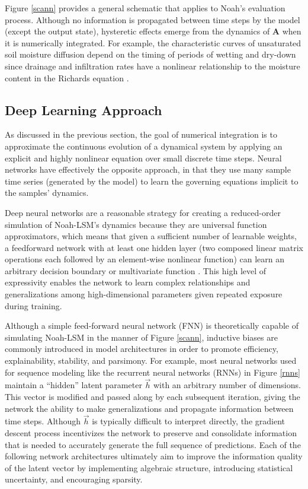 \documentclass[11pt]{article}
\begin{document}
\begin{multicols}{2}

    Figure \ref{scann} provides a general schematic that applies to Noah's evaluation process. Although no information is propagated between time steps by the model (except the output state), hysteretic effects emerge from the dynamics of \textbf{A} when it is numerically integrated. For example, the characteristic curves of unsaturated soil moisture diffusion depend on the timing of periods of wetting and dry-down since drainage and infiltration rates have a nonlinear relationship to the moisture content in the Richards equation \cite{jaynes_comparison_1984}.

    \subsection{Deep Learning Approach}

    As discussed in the previous section, the goal of numerical integration is to approximate the continuous evolution of a dynamical system by applying an explicit and highly nonlinear equation over small discrete time steps. Neural networks have effectively the opposite approach, in that they use many sample time series (generated by the model) to learn the governing equations implicit to the samples' dynamics.

    Deep neural networks are a reasonable strategy for creating a reduced-order simulation of Noah-LSM's dynamics because they are universal function approximators, which means that given a sufficient number of learnable weights, a feedforward network with at least one hidden layer (two composed linear matrix operations each followed by an element-wise nonlinear function) can learn an arbitrary decision boundary or multivariate function \cite{hornik_multilayer_1989}. This high level of expressivity enables the network to learn complex relationships and generalizations among high-dimensional parameters given repeated exposure during training.

    Although a simple feed-forward neural network (FNN) is theoretically capable of simulating Noah-LSM in the manner of Figure \ref{scann}, inductive biases are commonly introduced in model architectures in order to promote efficiency, explainability, stability, and parsimony. For example, most neural networks used for sequence modeling like the recurrent neural networks (RNNs) in Figure \ref{rnns} maintain a ``hidden'' latent parameter $\vec{h}$ with an arbitrary number of dimensions. This vector is modified and passed along by each subsequent iteration, giving the network the ability to make generalizations and propagate information between time steps. Although $\vec{h}$ is typically difficult to interpret directly, the gradient descent process incentivizes the network to preserve and consolidate information that is needed to accurately generate the full sequence of predictions. Each of the following network architectures ultimately aim to improve the information quality of the latent vector by implementing algebraic structure, introducing statistical uncertainty, and encouraging sparsity.


\end{multicols}
\end{document}
